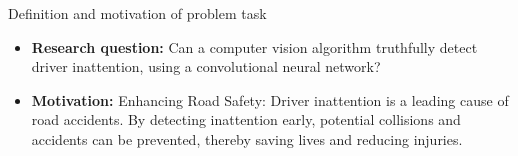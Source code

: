 

\maketitle
\begin{frame}{\huge{Definition and motivation of problem task}}
  \begin{itemize}
    \item \textbf{Research question:} Can a computer vision algorithm truthfully detect driver inattention, using a convolutional neural network? 
    \item \textbf{Motivation:} Enhancing Road Safety: Driver inattention is a leading cause of road accidents. By detecting inattention early, potential collisions and accidents can be prevented, thereby saving lives and reducing injuries.
  \end{itemize}
\end{frame}
% 
